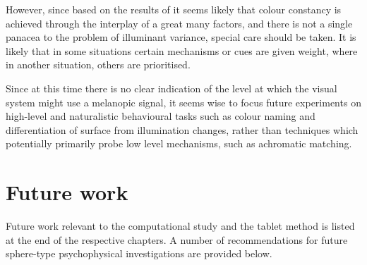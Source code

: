 However, since based on the results of \citet{kraft_mechanisms_1999} it seems likely that colour constancy is achieved through the interplay of a great many factors, and there is not a single panacea to the problem of illuminant variance, special care should be taken. It is likely that in some situations certain mechanisms or cues are given weight, where in another situation, others are prioritised.

Since at this time there is no clear indication of the level at which the visual system might use a melanopic signal, it seems wise to focus future experiments on high-level and naturalistic behavioural tasks such as colour naming and differentiation of surface from illumination changes, rather than techniques which potentially primarily probe low level mechanisms, such as achromatic matching.

\section{Future work} \label{sec:fut}

Future work relevant to the computational study and the tablet method is listed at the end of the respective chapters. A number of recommendations for future sphere-type psychophysical investigations are provided below.

